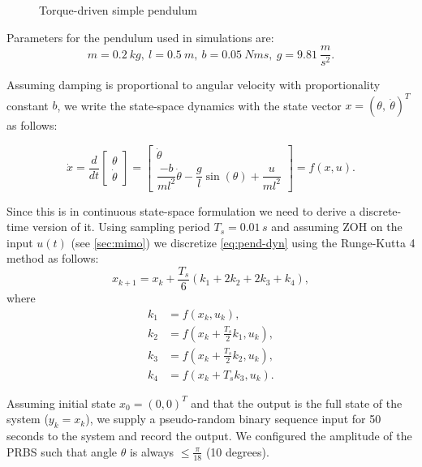 \documentclass[12pt,a4paper]{report}
\begin{document}
\begin{figure}[htbp]
    \centering
    
    \caption{Torque-driven simple pendulum}
    \label{fig:pendulum}
\end{figure}

Parameters for the pendulum used in simulations are:
\[m = 0.2\ kg, \ l = 0.5 \ m, \ b = 0.05\ Nms, \ g = 9.81 \ \frac{m}{s^2}.\]

Assuming damping is proportional to angular velocity with proportionality constant $b$, we write the state-space dynamics with the state vector \(x = (\theta, \ \dot{\theta})^T\) as follows:

\begin{equation}
    \dot{x} = \dfrac{d}{dt} \begin{bmatrix} \theta \\ \dot{\theta}\end{bmatrix} = \begin{bmatrix} \dot{\theta} \\ \dfrac{-b}{ml^2}\dot{\theta} - \dfrac{g}{l}\sin(\theta) + \dfrac{u}{ml^2}\end{bmatrix} = f(x, u).
    \label{eq:pend-dyn}
\end{equation}

Since this is in continuous state-space formulation we need to derive a discrete-time version of it. Using sampling period \(T_s = 0.01\,s\) and assuming
ZOH on the input $u(t)$ (see \ref{sec:mimo}) we discretize \eqref{eq:pend-dyn} using the Runge-Kutta 4 \cite{butcher2016numericalmethods} method as follows:
\begin{equation}
    x_{k+1} = x_k + \frac{T_s}{6}(k_1 + 2k_2 + 2k_3 + k_4) ,
    \label{eq:rk4}
\end{equation}
where
\begin{align*}
    k_1 &= f(x_k, u_k), \\
    k_2 &= f(x_k + \frac{T_s}{2}k_1, u_k), \\
    k_3 &= f(x_k + \frac{T_s}{2}k_2, u_k), \\
    k_4 &= f(x_k + T_sk_3, u_k).
\end{align*}

Assuming initial state \(x_0 = (0, 0)^T\) and that the output is the full state of the system ($y_k = x_k$), we supply a pseudo-random binary sequence input for 50 seconds to the system and record the output. We configured the amplitude of the PRBS such that angle $\theta$ is always $\leq \frac{\pi}{18}$ (10 degrees).

\newpage
\end{document}
